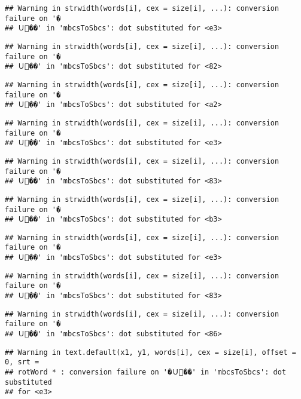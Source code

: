 \documentclass[]{article}
\begin{document}
\begin{verbatim}
## Warning in strwidth(words[i], cex = size[i], ...): conversion failure on '�
## Ｕ��' in 'mbcsToSbcs': dot substituted for <e3>
\end{verbatim}

\begin{verbatim}
## Warning in strwidth(words[i], cex = size[i], ...): conversion failure on '�
## Ｕ��' in 'mbcsToSbcs': dot substituted for <82>
\end{verbatim}

\begin{verbatim}
## Warning in strwidth(words[i], cex = size[i], ...): conversion failure on '�
## Ｕ��' in 'mbcsToSbcs': dot substituted for <a2>
\end{verbatim}

\begin{verbatim}
## Warning in strwidth(words[i], cex = size[i], ...): conversion failure on '�
## Ｕ��' in 'mbcsToSbcs': dot substituted for <e3>
\end{verbatim}

\begin{verbatim}
## Warning in strwidth(words[i], cex = size[i], ...): conversion failure on '�
## Ｕ��' in 'mbcsToSbcs': dot substituted for <83>
\end{verbatim}

\begin{verbatim}
## Warning in strwidth(words[i], cex = size[i], ...): conversion failure on '�
## Ｕ��' in 'mbcsToSbcs': dot substituted for <b3>
\end{verbatim}

\begin{verbatim}
## Warning in strwidth(words[i], cex = size[i], ...): conversion failure on '�
## Ｕ��' in 'mbcsToSbcs': dot substituted for <e3>
\end{verbatim}

\begin{verbatim}
## Warning in strwidth(words[i], cex = size[i], ...): conversion failure on '�
## Ｕ��' in 'mbcsToSbcs': dot substituted for <83>
\end{verbatim}

\begin{verbatim}
## Warning in strwidth(words[i], cex = size[i], ...): conversion failure on '�
## Ｕ��' in 'mbcsToSbcs': dot substituted for <86>
\end{verbatim}

\begin{verbatim}
## Warning in text.default(x1, y1, words[i], cex = size[i], offset = 0, srt =
## rotWord * : conversion failure on '�Ｕ��' in 'mbcsToSbcs': dot substituted
## for <e3>
\end{verbatim}
\end{document}
